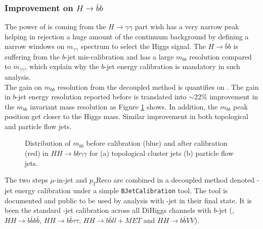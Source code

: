 \subsubsection{Improvement on $H\rightarrow\bar{b}b$}
 The power of \HHyybb is coming from the $H\rightarrow\gamma\gamma$ part wish has a very narrow peak helping in rejection a huge amount of the continuum background by defining a narrow windows on $m_{\gamma\gamma}$ spectrum to select the Higgs signal. The $H\rightarrow\bar{b}b$ is suffering from the $b$-jet mis-calibration and has a large $m_{bb}$ resolution compared to $m_{\gamma\gamma}$, which explain why the $b$-jet energy calibration is  mandatory in such analysis.\\
The gain on $m_{bb}$ resolution from the decoupled method is quantifies on \HHyybb. The gain in $b$-jet energy resolution reported before is translated into $\sim$22\% improvement in the $m_{bb}$ invariant mass resolution as Figure \ref{fig:Jet:Cal:BCal:Result:mbb} shows. In addition, the $m_{bb}$ peak position get closer to the Higgs mass. Similar improvement in both topological and particle flow jets. 
\begin{figure}[ht]
   \centering
   \quad
   \caption{Distribution of $m_{bb}$ before calibration (blue) and after calibration (red) in $HH\rightarrow bb\gamma\gamma$ for (a) topological cluster jets (b) particle flow jets.}
   \label{fig:Jet:Cal:BCal:Result:mbb}
\end{figure}
The two steps $\mu$-in-jet and $p_T$Reco are combined in a decoupled method denoted \bq-jet energy calibration under a simple \texttt{BJetCalibration} tool. The tool is documented and public to be used by analysis with \bq-jet in their final state. It is been the standard \bq-jet calibration across all DiHiggs channels with $b$-jet (\HHyybb, $HH\rightarrow b\bar{b}b\bar{b}$, $HH\rightarrow b\bar{b}\tau\tau$,  $HH\rightarrow b\bar{b}ll+MET$ and $HH\rightarrow b\bar{b}VV$).
